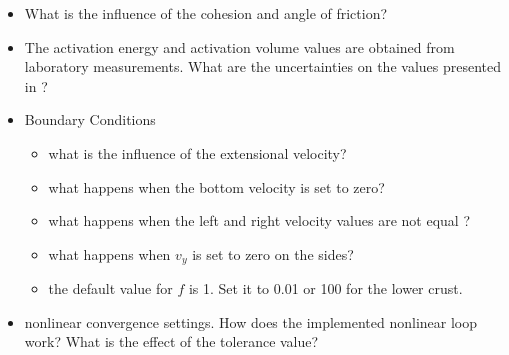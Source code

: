 \documentclass[a4paper]{article}
\begin{document}
\begin{itemize}
\item What is the influence of the cohesion and angle of friction? 
\item The activation energy and activation volume values are obtained from laboratory measurements. What are the uncertainties on the values presented in \cite{nabu15}?
\item Boundary Conditions 
\begin{itemize}
\item what is the influence of the extensional velocity?
\item what happens when the bottom velocity is set to zero?
\item what happens when the left and right velocity values are not equal ?
\item what happens when $v_y$ is set to zero on the sides?
\item the default value for $f$ is 1. Set it to 0.01 or 100 for the lower crust.
\end{itemize}



\item nonlinear convergence settings. How does the implemented nonlinear loop work? What is the effect of the tolerance value?

\end{itemize}





\end{document}

